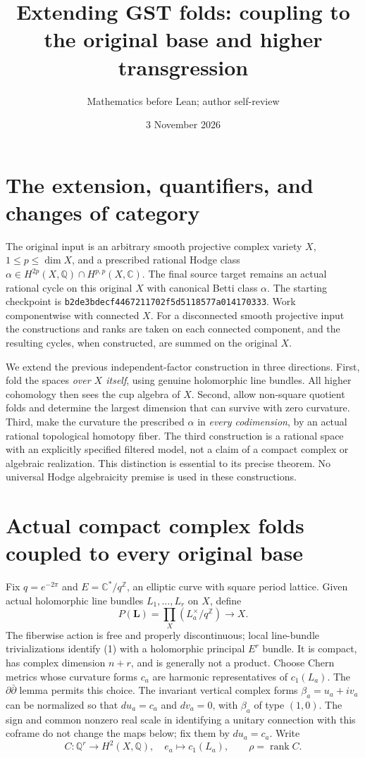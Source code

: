 \documentclass[11pt]{article}
\title{Extending GST folds: coupling to the original base and higher transgression}
\author{Mathematics before Lean; author self-review}
\date{3 November 2026}
\newcommand{\Q}{\mathbb Q}
\newcommand{\C}{\mathbb C}
\newcommand{\rk}{\operatorname{rank}}
\begin{document}
\maketitle

\section{The extension, quantifiers, and changes of category}
The original input is an arbitrary smooth projective complex variety $X$,
$1\leq p\leq\dim X$, and a prescribed rational Hodge class
$\alpha\in H^{2p}(X,\Q)\cap H^{p,p}(X,\C)$. The final source target remains
an actual rational cycle on this original $X$ with canonical Betti class
$\alpha$. The starting checkpoint is
\texttt{b2de3bdecf4467211702f5d5118577a014170333}.
Work componentwise with connected $X$. For a disconnected smooth projective
input the constructions and ranks are taken on each connected component,
and the resulting cycles, when constructed, are summed on the original $X$.

We extend the previous independent-factor construction in three directions.
First, fold the spaces \emph{over $X$ itself}, using genuine holomorphic
line bundles. All higher cohomology then sees the cup algebra of $X$.
Second, allow non-square quotient folds and determine the largest dimension
that can survive with zero curvature. Third, make the curvature the
prescribed $\alpha$ in \emph{every codimension}, by an actual rational
topological homotopy fiber. The third construction is a rational space with
an explicitly specified filtered model, not a claim of a compact complex or
algebraic realization. This distinction is essential to its precise theorem.
No universal Hodge algebraicity premise is used in these constructions.

\section{Actual compact complex folds coupled to every original base}
Fix $q=e^{-2\pi}$ and $E=\C^*/q^{\mathbb Z}$, an elliptic curve with square
period lattice. Given actual holomorphic line bundles $L_1,\ldots,L_r$ on
$X$, define
\[
 P(\mathbf L)=\prod_X (L_a^\times/q^{\mathbb Z})\longrightarrow X.       \tag{1}
\]
The fiberwise action is free and properly discontinuous; local line-bundle
trivializations identify (1) with a holomorphic principal $E^r$ bundle.
It is compact, has complex dimension $n+r$, and is generally not a product.
Choose Chern metrics whose curvature forms $c_a$ are harmonic representatives
of $c_1(L_a)$. The $\partial\bar\partial$ lemma permits this choice.
The invariant vertical complex forms $\beta_a=u_a+i v_a$ can be normalized
so that $d u_a=c_a$ and $d v_a=0$, with $\beta_a$ of type $(1,0)$.
The sign and common nonzero real scale in identifying a unitary connection
with this coframe do not change the maps below; fix them by $d u_a=c_a$.
Write
\[
 C:\Q^r\longrightarrow H^2(X,\Q),\quad e_a\longmapsto c_1(L_a),
 \qquad\rho=\rk C.                                                   \tag{2}
\]
\end{document}
